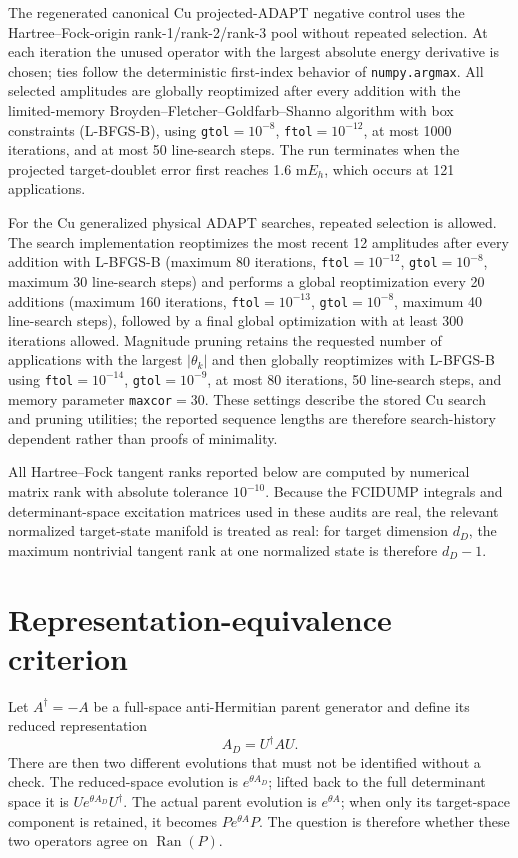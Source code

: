 \documentclass[
 aip,
 jcp,
 amsmath,amssymb,
 preprint
]{revtex4-2}
\begin{document}
The regenerated canonical Cu projected-ADAPT negative control uses the Hartree--Fock-origin rank-1/rank-2/rank-3 pool without repeated selection.
At each iteration the unused operator with the largest absolute energy derivative is chosen; ties follow the deterministic first-index behavior of \texttt{numpy.argmax}.
All selected amplitudes are globally reoptimized after every addition with the limited-memory Broyden--Fletcher--Goldfarb--Shanno algorithm with box constraints (L-BFGS-B), using \texttt{gtol}$=10^{-8}$, \texttt{ftol}$=10^{-12}$, at most 1000 iterations, and at most 50 line-search steps.
The run terminates when the projected target-doublet error first reaches 1.6 m$E_h$, which occurs at 121 applications.

For the Cu generalized physical ADAPT searches, repeated selection is allowed.
The search implementation reoptimizes the most recent 12 amplitudes after every addition with L-BFGS-B (maximum 80 iterations, \texttt{ftol}$=10^{-12}$, \texttt{gtol}$=10^{-8}$, maximum 30 line-search steps) and performs a global reoptimization every 20 additions (maximum 160 iterations, \texttt{ftol}$=10^{-13}$, \texttt{gtol}$=10^{-8}$, maximum 40 line-search steps), followed by a final global optimization with at least 300 iterations allowed.
Magnitude pruning retains the requested number of applications with the largest $|\theta_k|$ and then globally reoptimizes with L-BFGS-B using \texttt{ftol}$=10^{-14}$, \texttt{gtol}$=10^{-9}$, at most 80 iterations, 50 line-search steps, and memory parameter \texttt{maxcor}$=30$.
These settings describe the stored Cu search and pruning utilities; the reported sequence lengths are therefore search-history dependent rather than proofs of minimality.

All Hartree--Fock tangent ranks reported below are computed by numerical matrix rank with absolute tolerance $10^{-10}$.
Because the FCIDUMP integrals and determinant-space excitation matrices used in these audits are real, the relevant normalized target-state manifold is treated as real: for target dimension $d_D$, the maximum nontrivial tangent rank at one normalized state is therefore $d_D-1$.

\section{Representation-equivalence criterion}

Let $A^\dagger=-A$ be a full-space anti-Hermitian parent generator and define its reduced representation
\[
A_D=U^\dagger A U.
\]
There are then two different evolutions that must not be identified without a check.
The reduced-space evolution is $e^{\theta A_D}$; lifted back to the full determinant space it is
$Ue^{\theta A_D}U^\dagger$.
The actual parent evolution is $e^{\theta A}$; when only its target-space component is retained, it becomes $Pe^{\theta A}P$.
The question is therefore whether these two operators agree on $\operatorname{Ran}(P)$.
\end{document}

